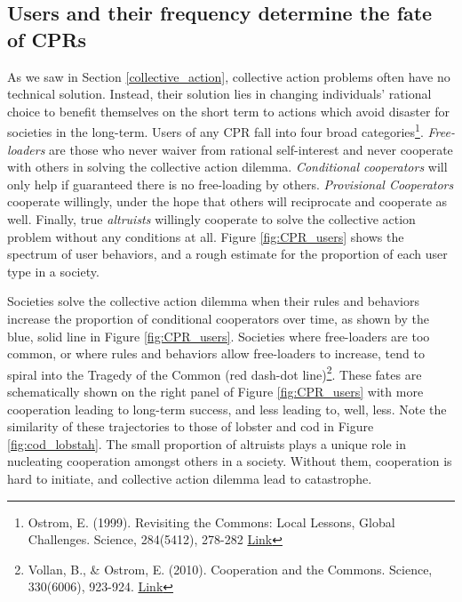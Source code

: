 \subsection{Users and their frequency determine the fate of CPRs}
As we saw in Section \ref{collective_action}, collective action problems often have no technical solution. Instead, their solution lies in changing individuals' rational choice to benefit themselves on the short term to actions which avoid disaster for societies in the long-term. Users of any CPR fall into four broad categories\footnote{Ostrom, E. (1999). Revisiting the Commons: Local Lessons, Global Challenges. Science, 284(5412), 278-282 \href{https://doi.org/10.1126/science.284.5412.278}{Link}}. \emph{Free-loaders} are those who never waiver from rational self-interest and never cooperate with others in solving the collective action dilemma. \emph{Conditional cooperators} will only help if guaranteed there is no free-loading by others. \emph{Provisional Cooperators} cooperate willingly, under the hope that others will reciprocate and cooperate as well. Finally, true \emph{altruists} willingly cooperate to solve the collective action problem without any conditions at all. Figure \ref{fig:CPR_users} shows the spectrum of user behaviors, and a rough estimate for the proportion of each user type in a society. 

Societies solve the collective action dilemma when their rules and behaviors increase the proportion of conditional cooperators over time, as shown by the blue, solid line in Figure \ref{fig:CPR_users}. Societies where free-loaders are too common, or where rules and behaviors allow free-loaders to increase, tend to spiral into the Tragedy of the Common (red dash-dot line)\footnote{Vollan, B., \& Ostrom, E. (2010). Cooperation and  the Commons. Science, 330(6006), 923-924. \href{https://doi.org/10.1126/science.1198347}{Link}}. These fates are schematically shown on the right panel of Figure \ref{fig:CPR_users} with more cooperation leading to long-term success, and less leading to, well, less. Note the similarity of these trajectories to those of lobster and cod in Figure \ref{fig:cod_lobstah}. The small proportion of altruists plays a unique role in nucleating cooperation amongst others in a society. Without them, cooperation is hard to initiate, and collective action dilemma lead to catastrophe.  

